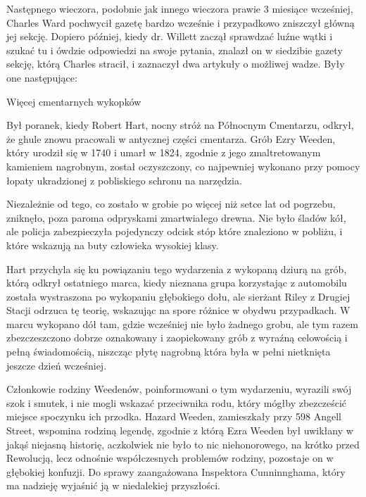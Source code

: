 Następnego wieczora, podobnie jak innego wieczora prawie 3 miesiące wcześniej, Charles Ward pochwycił gazetę bardzo wcześnie i przypadkowo zniszczył główną jej sekcję. Dopiero później, kiedy dr. Willett zaczął sprawdzać luźne wątki i szukać tu i ówdzie odpowiedzi na swoje pytania, znalazł on w siedzibie gazety sekcję, którą Charles stracił, i zaznaczył dwa artykuły o możliwej wadze. Były one następujące: 

\begin{displayquote}

\begin{center}
Więcej cmentarnych wykopków
\end{center}

Był poranek, kiedy Robert Hart, nocny stróż na Północnym Cmentarzu, odkrył, że ghule znowu pracowali w antycznej części cmentarza. Grób Ezry Weeden, który urodził się w 1740 i umarł w 1824, zgodnie z jego zmaltretowanym kamieniem nagrobnym, został oczyszczony, co najpewniej wykonano przy pomocy łopaty ukradzionej z pobliskiego schronu na narzędzia. 

Niezależnie od tego, co zostało w grobie po więcej niż setce lat od pogrzebu, zniknęło, poza paroma odpryskami zmartwiałego drewna. Nie było śladów kół, ale policja zabezpieczyła pojedynczy odcisk stóp które znaleziono w pobliżu, i które wskazują na buty człowieka wysokiej klasy. 

Hart przychyla się ku powiązaniu tego wydarzenia z wykopaną dziurą na grób, którą odkrył ostatniego marca, kiedy nieznana grupa korzystając z automobilu została wystraszona po wykopaniu głębokiego dołu, ale sierżant Riley z Drugiej Stacji odrzuca tę teorię, wskazując na spore różnice w obydwu przypadkach. W marcu wykopano dół tam, gdzie wcześniej nie było żadnego grobu, ale tym razem zbezczeszczono dobrze oznakowany i zaopiekowany grób z wyraźną celowością i pełną świadomością, niszcząc płytę nagrobną która była w pełni nietknięta jeszcze dzień wcześniej.  

Członkowie rodziny Weedenów, poinformowani o tym wydarzeniu, wyrazili swój szok i smutek, i nie mogli wskazać przeciwnika rodu, który mógłby zbezcześcić miejsce spoczynku ich przodka. Hazard Weeden, zamieszkały przy 598 Angell Street, wspomina rodziną legendę, zgodnie z którą Ezra Weeden był uwikłany w jakąś niejasną historię, aczkolwiek nie było to nic niehonorowego, na krótko przed Rewolucją, lecz odnośnie współczesnych problemów rodziny, pozostaje on w głębokiej konfuzji. Do sprawy zaangażowana Inspektora Cunninnghama, który ma nadzieję wyjaśnić ją w niedalekiej przyszłości. 


\end{displayquote}
